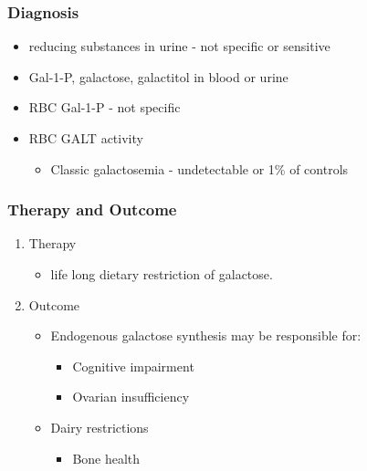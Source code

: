 \documentclass{scrartcl}
\begin{document}




\subsubsection{Diagnosis}
\label{sec:org2ff5b87}
\begin{itemize}
\item reducing substances in urine - not specific or sensitive
\item Gal-1-P, galactose, galactitol in blood or urine
\item RBC Gal-1-P - not specific
\item RBC GALT activity
\begin{itemize}
\item Classic galactosemia - undetectable or 1\% of controls
\end{itemize}
\end{itemize}

\subsubsection{Therapy and Outcome}
\label{sec:org33affe2}

\begin{enumerate}
\item Therapy
\label{sec:org9a9eb08}
\begin{itemize}
\item life long dietary restriction of galactose.
\end{itemize}

\item Outcome
\label{sec:org5e89818}
\begin{itemize}
\item Endogenous galactose synthesis may be responsible for:
\begin{itemize}
\item Cognitive impairment
\item Ovarian insufficiency
\end{itemize}
\item Dairy restrictions
\begin{itemize}
\item Bone health
\end{itemize}
\end{itemize}
\end{enumerate}
\end{document}
